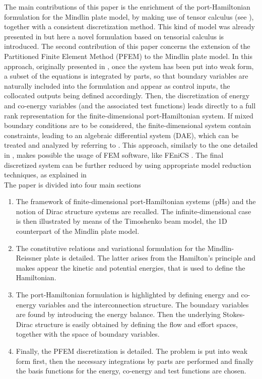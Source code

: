 \documentclass[preprint,12pt]{elsarticle}
\begin{document}
	The main contributions of this paper is the enrichment of the port-Hamiltonian formulation for the Mindlin plate model, by making use of tensor calculus (see \cite[Chapter~16]{Grinfield}), together with a consistent discretization method.  This kind of model was already presented in \cite{MacchelliMindlin} but here a novel formulation based on tensorial calculus is introduced. The second contribution of this paper concerns the extension of the Partitioned Finite Element Method (PFEM) to the Mindlin plate model. In this approach, originally presented in \cite{CardosoRibeiro2018}, once the system has been put into weak form, a subset of the equations is integrated by parts, so that boundary variables are naturally included into the formulation and appear as control inputs, the collocated outputs being defined accordingly. Then, the discretization of energy and co-energy variables (and the associated test functions) leads directly to a full rank representation for the finite-dimensional port-Hamiltonian system. If mixed boundary conditions are to be considered, the finite-dimensional system contain constraints, leading to an algebraic differential system (DAE), which can be treated and analyzed by referring to \cite{vanderSchaft2013, beattie2017port}. This approach, similarly to the one detailed in \cite{WeakForm_Kot}, makes possible the usage of FEM software, like FEniCS \cite{LoggMardalEtAl2012}. The final discretized system can be further reduced by using appropriate model reduction techniques, as explained in \cite{TONG20132727, Mehrmann2018}  \\
	
	The paper is divided into four main sections 
	\begin{enumerate}
		\item The framework of finite-dimensional port-Hamiltonian systems (pHs) and the notion of Dirac structure systems are recalled. The infinite-dimensional case is then illustrated by means of the Timoshenko beam model, the 1D counterpart of the Mindlin plate model.
		\item The constitutive relations and variational formulation for the Mindlin-Reissner plate is detailed. The latter arises from the Hamilton's principle and makes appear the kinetic and potential energies, that is used to define the Hamiltonian.
		\item The port-Hamiltonian formulation is highlighted by defining energy and co-energy variables and the interconnection structure. The boundary variables are found by introducing the energy balance. Then the underlying Stokes-Dirac structure is easily obtained by defining the flow and effort spaces, together with the space of boundary variables.
		\item Finally, the PFEM discretization is detailed. The problem is put into weak form first, then the necessary integrations by parts are performed and finally the basis functions for the energy, co-energy and test functions are chosen.
	\end{enumerate}
\end{document}
